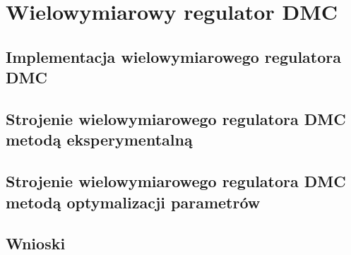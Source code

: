 \chapter{Wielowymiarowy regulator DMC}
\label{pro_dmc}

\section{Implementacja wielowymiarowego regulatora DMC}
\label{pro_dmc_implementacja}


\section{Strojenie wielowymiarowego regulatora DMC metodą eksperymentalną}
\label{pro_dmc_strojenie}


\section{Strojenie wielowymiarowego regulatora DMC metodą optymalizacji parametrów}
\label{pro_dmc_optymalizacja}


\section{Wnioski}
\label{pro_dmc_wnioski}
